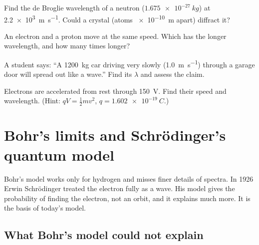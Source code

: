 \begin{quickcheck}
  \item Find the de Broglie wavelength of a neutron ($\qty{1.675e-27}{kg}$) at
        \qty{2.2e3}{m.s^{-1}}. Could a crystal (atoms \qty{e-10}{m} apart) diffract it?
  \item An electron and a proton move at the same speed. Which has the longer wavelength, and
        how many times longer?
  \item A student says: ``A \qty{1200}{kg} car driving very slowly (\qty{1.0}{m.s^{-1}})
        through a garage door will spread out like a wave.'' Find its $\lambda$ and assess the
        claim.
  \item Electrons are accelerated from rest through \qty{150}{V}. Find their speed and
        wavelength. (Hint: $qV = \frac12 mv^2$, $q = \qty{1.602e-19}{C}$.)\label{ch3:qc:volt}
\end{quickcheck}

\section{Bohr's limits and Schrödinger's quantum model}\label{ch3:sec:schrodinger}

\begin{bigidea}
Bohr's model works only for hydrogen and misses finer details of spectra. In 1926 Erwin
Schrödinger treated the electron fully as a wave. His model gives the probability of finding
the electron, not an orbit, and it explains much more. It is the basis of today's model.
\end{bigidea}

\begin{keywords}
\end{keywords}

\subsection{What Bohr's model could not explain}


